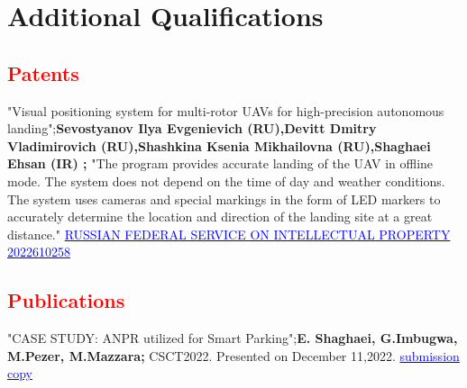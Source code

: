 \section{Additional Qualifications}

\renewcommand{\labelitemi}{o}
\subsection{\textbf{\textcolor{red}{Patents}}}
    {"Visual positioning system for multi-rotor UAVs for high-precision autonomous landing";\textbf{Sevostyanov Ilya Evgenievich (RU),Devitt Dmitry Vladimirovich (RU),Shashkina Ksenia Mikhailovna (RU),Shaghaei Ehsan (IR) ;} "The program provides accurate landing of the UAV in offline mode. The system does not depend on the time of day and weather conditions. The system uses cameras and special markings in the form of LED markers to accurately determine the location and direction of the landing site at a great distance."  \href{https://new.fips.ru/registers-doc-view/fips_servlet?DB=EVM&DocNumber=2022610258}{\textcolor{blue}{RUSSIAN FEDERAL SERVICE
ON INTELLECTUAL PROPERTY 2022610258} }}

\subsection{\textbf{\textcolor{red}{Publications}}}
	
    {"CASE STUDY: ANPR utilized for Smart Parking";\textbf{E. Shaghaei, G.Imbugwa, M.Pezer, M.Mazzara;} CSCT2022. Presented on December 11,2022. \href{https://drive.google.com/file/d/1HQON2v-FcR6aVfwKHJz9oor0xCwBEwab/view?usp=sharing}{\textcolor{blue}{submission copy}}}
    
    


